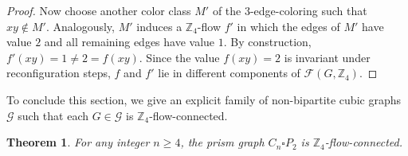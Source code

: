 \documentclass[a4paper,12pt]{article}
\theoremstyle{plain}
\newtheorem{theorem}{Theorem}[section]
\theoremstyle{definition}
\newcommand{\Z}{\mathbb{Z}}
\newcommand\F{\mathcal{F}}
\newcommand\G{\mathcal{G}}
\renewcommand\ge\geqslant
\begin{document}
\begin{proof}
Now choose another color class $M'$ of the $3$-edge-coloring such that $xy \notin M'$. 
Analogously, $M'$ induces a $\mathbb Z_4$-flow $f'$ in which the edges of $M'$ have value $2$ and all remaining edges have value $1$. 
By construction, $f'(xy) = 1 \neq 2 = f(xy)$. 
Since the value $f(xy)=2$ is invariant under reconfiguration steps, $f$ and $f'$ lie in different components of $\F(G,\mathbb Z_4)$. 
\end{proof}




To conclude this section, we give an explicit family of non-bipartite cubic graphs $\G$ such that each $G\in \G$ is $\Z_4$-flow-connected.

\begin{theorem}
For any integer $n\ge 4$, the prism graph $C_n \square P_2$ is $\mathbb{Z}_4$-flow-connected.
\label{odd-prism-thm}
\end{theorem}
\end{document}
